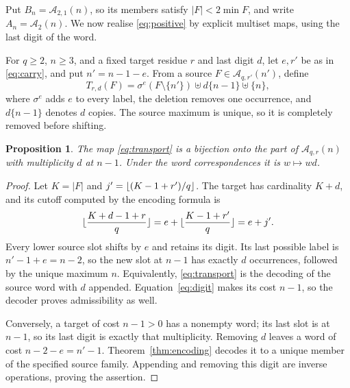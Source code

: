 \documentclass[11pt,a4paper]{article}
\newtheorem{proposition}[theorem]{Proposition}
\theoremstyle{remark}
\newcommand{\A}{\mathcal A}
\DeclarePairedDelimiter{\floor}{\lfloor}{\rfloor}
\begin{document}
Put $B_n=\A_{2,1}(n)$, so its members satisfy $|F|<2\min F$, and write
$A_n=\A_2(n)$. We now realise \eqref{eq:positive} by explicit multiset maps, using
the last digit of the word.

For $q\ge2$, $n\ge3$, and a fixed target residue $r$ and last digit $d$,
let $e,r'$ be as in \eqref{eq:carry}, and put $n'=n-1-e$. From a source
$F\in\A_{q,r'}(n')$, define
\begin{equation}\label{eq:transport}
 T_{r,d}(F)=\sigma^e(F\setminus\{n'\})
                \uplus d\{n-1\}\uplus\{n\},
\end{equation}
where $\sigma^e$ adds $e$ to every label, the deletion removes one
occurrence, and $d\{n-1\}$ denotes $d$ copies. The source maximum is
unique, so it is completely removed before shifting.

\begin{proposition}\label{prop:maps}
The map \eqref{eq:transport} is a bijection onto the part of
$\A_{q,r}(n)$ with multiplicity $d$ at $n-1$. Under the word
correspondences it is $w\mapsto wd$.
\end{proposition}

\begin{proof}
Let $K=|F|$ and $j'=\floor{(K-1+r')/q}$. The target has cardinality
$K+d$, and its cutoff computed by the encoding formula is
\[
 \floor{\frac{K+d-1+r}{q}}
   =e+\floor{\frac{K-1+r'}q}=e+j'.
\]
Every lower source slot shifts by $e$ and retains its digit. Its last
possible label is $n'-1+e=n-2$, so the new slot at $n-1$ has exactly
$d$ occurrences, followed by the unique maximum $n$. Equivalently,
\eqref{eq:transport} is the decoding of the source word with $d$
appended. Equation~\eqref{eq:digit} makes its cost $n-1$, so the decoder
proves admissibility as well.

Conversely, a target of cost $n-1>0$ has a nonempty word; its last slot is
at $n-1$, so its last digit is exactly that multiplicity. Removing $d$
leaves a word of cost $n-2-e=n'-1$. Theorem~\ref{thm:encoding} decodes
it to a unique member of the specified source family. Appending and
removing this digit are inverse operations, proving the assertion.
\end{proof}
\end{document}
